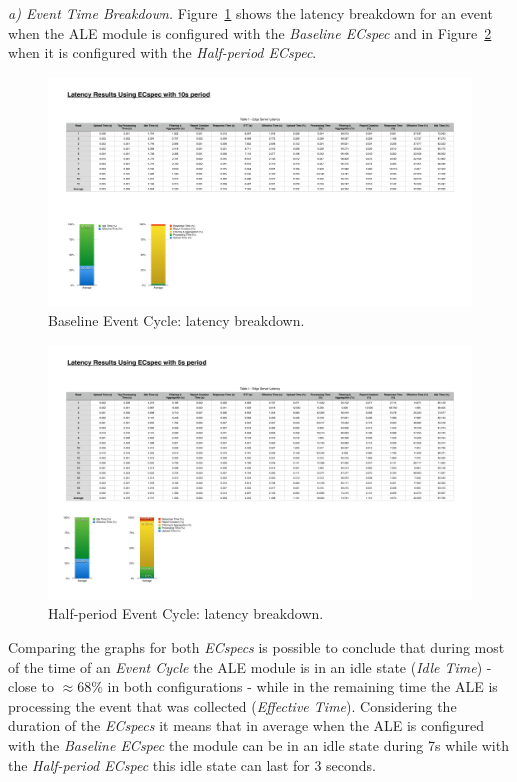 \textit{a) Event Time Breakdown.}
Figure~\ref{fig:ecspec_base} shows the latency breakdown for an event when the \gls{ALE} module is
configured with the \textit{Baseline ECspec} and in Figure~\ref{fig:ecspec_half} when it is configured
with the \textit{Half-period ECspec}.

\begin{figure}[ht!]
 \centering
 \includegraphics[width=.6\linewidth]{./figures/edge_ecspec_breakdown}
 \caption{Baseline Event Cycle: latency breakdown.}
 \label{fig:ecspec_base}
\end{figure}

\begin{figure}[ht!]
 \centering
 \includegraphics[width=.6\linewidth]{./figures/edge_ecspecf_breakdown}
 \caption{Half-period Event Cycle: latency breakdown.}
 \label{fig:ecspec_half}
\end{figure}

Comparing the graphs for both \textit{ECspecs} is possible to conclude that during most of the time of
an \textit{Event Cycle} the \gls{ALE} module is in an idle state (\textit{Idle Time}) - close to $\approx68\%$
in both configurations - while in the remaining time the \gls{ALE} is processing the event that was
collected (\textit{Effective Time}). Considering the duration of the \textit{ECspecs} it means that in
average when the \gls{ALE} is configured with the \textit{Baseline ECspec} the module can be in an idle
state during 7s while with the \textit{Half-period ECspec} this idle state can last for 3 seconds.\\

